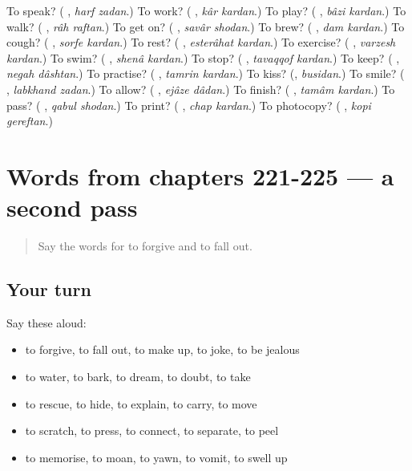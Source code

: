 \begin{tcolorbox}[breakable,colback=teal!4,colframe=teal!35!black,title={Before you move on}]
To speak? (\textbf{ }, \emph{harf zadan}.) To work? (\textbf{ }, \emph{kâr kardan}.) To play? (\textbf{ }, \emph{bâzi kardan}.) To walk? (\textbf{ }, \emph{râh raftan}.) To get on? (\textbf{ }, \emph{savâr shodan}.) To brew? (\textbf{ }, \emph{dam kardan}.) To cough? (\textbf{ }, \emph{sorfe kardan}.) To rest? (\textbf{ }, \emph{esterâhat kardan}.) To exercise? (\textbf{ }, \emph{varzesh kardan}.) To swim? (\textbf{ }, \emph{shenâ kardan}.) To stop? (\textbf{ }, \emph{tavaqqof kardan}.) To keep? (\textbf{ }, \emph{negah dâshtan}.) To practise? (\textbf{ }, \emph{tamrin kardan}.) To kiss? (\textbf{}, \emph{busidan}.) To smile? (\textbf{ }, \emph{labkhand zadan}.) To allow? (\textbf{ }, \emph{ejâze dâdan}.) To finish? (\textbf{ }, \emph{tamâm kardan}.) To pass? (\textbf{ }, \emph{qabul shodan}.) To print? (\textbf{ }, \emph{chap kardan}.) To photocopy? (\textbf{ }, \emph{kopi gereftan}.)
\end{tcolorbox}
\section[(dialogue)]{Words from chapters 221-225 — a second pass}

\label{lesson:FA-R225-second-pass-words-from-chapters-221-225}



\begin{quote}
Say the words for to forgive and to fall out.
\end{quote}

\subsection*{Your turn}
Say these aloud:

\begin{itemize}
\raggedright
  \item to forgive, to fall out, to make up, to joke, to be jealous
  \item to water, to bark, to dream, to doubt, to take
  \item to rescue, to hide, to explain, to carry, to move
  \item to scratch, to press, to connect, to separate, to peel
  \item to memorise, to moan, to yawn, to vomit, to swell up
\end{itemize}

